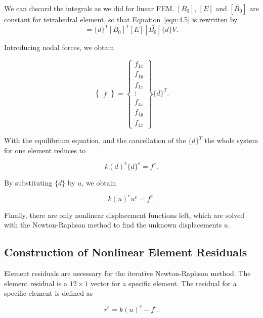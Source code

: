 \noindent We can discard the integrals as we did for linear FEM. $[B_{0}]$, $[E]$ and $[\bar{B_{0}}]$ are constant for tetrahedral element, so that Equation~\ref{eqn:4.5} is rewritten by
\begin{equation}
[k(u)] = \{d\}^T[B_{0}]^T[E][\bar{B_{0}}]\{d\} V.
\label{eqn:4.5-1}
\end{equation}

\noindent Introducing nodal forces, we obtain

\begin{equation}
\begin{Bmatrix}
 f
 \end{Bmatrix}
 =
\begin{Bmatrix}
f_{1x} \\ f_{1y} \\ f_{1z} \\ \vdots \\ f_{4x} \\ f_{4y} \\ f_{4z}
\end{Bmatrix}
\{d\}^T.
\label{eqn:4.5-2}
\end{equation}

\noindent With the equilibrium equation, and the cancellation of the $\{d\}^T$ the whole system for one element reduces to

\begin{equation}
k(d)^e\{d\}^e = f^e.
\label{eqn:4.6}
\end{equation}

\noindent By substituting $\{d\}$ by $u$, we obtain

\begin{equation}
k(u)^{e}u^{e} = f^{e}.
\label{eqn:4.6-1}
\end{equation}

\noindent Finally, there are only nonlinear displacement functions left, which are solved with the Newton-Raphson method to find the unknown displacements ${u}$.

\subsection{Construction of Nonlinear Element Residuals}

Element residuals are necessary for the iterative Newton-Raphson method. The element residual is a $12 \times 1$ vector for a specific element. The residual for a specific element is defined as

\begin{equation}
r^{e} = k(u)^{e} - f^{e}.
\label{eqn:4.6-2}
\end{equation}

